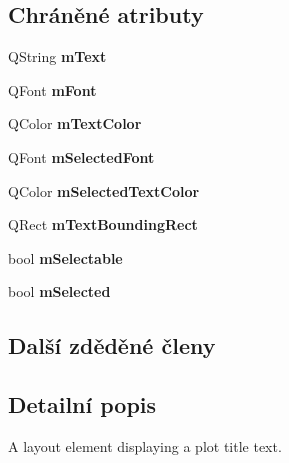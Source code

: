 \subsection*{Chráněné atributy}
\begin{DoxyCompactItemize}
\item 
\hypertarget{classQCPPlotTitle_a0d961bfac1211d59d3b0bc30d35f6379}{}Q\+String {\bfseries m\+Text}\label{classQCPPlotTitle_a0d961bfac1211d59d3b0bc30d35f6379}

\item 
\hypertarget{classQCPPlotTitle_ad9e2c2a2e941f3444cb692a51df0df62}{}Q\+Font {\bfseries m\+Font}\label{classQCPPlotTitle_ad9e2c2a2e941f3444cb692a51df0df62}

\item 
\hypertarget{classQCPPlotTitle_a5d7f834d6522c1a72fb0682c0b7ebe13}{}Q\+Color {\bfseries m\+Text\+Color}\label{classQCPPlotTitle_a5d7f834d6522c1a72fb0682c0b7ebe13}

\item 
\hypertarget{classQCPPlotTitle_a95003186c39bbab902873a8ef4cbb547}{}Q\+Font {\bfseries m\+Selected\+Font}\label{classQCPPlotTitle_a95003186c39bbab902873a8ef4cbb547}

\item 
\hypertarget{classQCPPlotTitle_a8b9760e62af92814c4effdd7ad69c5f9}{}Q\+Color {\bfseries m\+Selected\+Text\+Color}\label{classQCPPlotTitle_a8b9760e62af92814c4effdd7ad69c5f9}

\item 
\hypertarget{classQCPPlotTitle_a7178a0f6c1e633c144c17b4de4e0b840}{}Q\+Rect {\bfseries m\+Text\+Bounding\+Rect}\label{classQCPPlotTitle_a7178a0f6c1e633c144c17b4de4e0b840}

\item 
\hypertarget{classQCPPlotTitle_aadefb5e2b19b1cc7deda0a55ec747884}{}bool {\bfseries m\+Selectable}\label{classQCPPlotTitle_aadefb5e2b19b1cc7deda0a55ec747884}

\item 
\hypertarget{classQCPPlotTitle_afef1342a20f5ca985a20b9cfdc03d815}{}bool {\bfseries m\+Selected}\label{classQCPPlotTitle_afef1342a20f5ca985a20b9cfdc03d815}

\end{DoxyCompactItemize}
\subsection*{Další zděděné členy}


\subsection{Detailní popis}
A layout element displaying a plot title text. 

